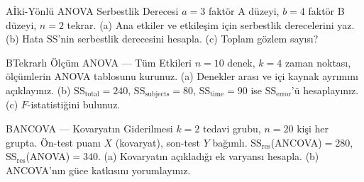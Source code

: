 \begin{alistirma}[Al.16.10]{A}{İki-Yönlü ANOVA Serbestlik Derecesi}
$a=3$ faktör A düzeyi, $b=4$ faktör B düzeyi, $n=2$ tekrar. (a) Ana etkiler ve etkileşim için serbestlik derecelerini yaz. (b) Hata SS'nin serbestlik derecesini hesapla. (c) Toplam gözlem sayısı?
\end{alistirma}

\begin{alistirma}[Al.16.11]{B}{Tekrarlı Ölçüm ANOVA --- Tüm Etkileri}
$n=10$ denek, $k=4$ zaman noktası, ölçümlerin ANOVA tablosunu kurunuz. (a) Denekler arası ve içi kaynak ayrımını açıklayınız. (b) $\mathrm{SS}_\mathrm{total}=240$, $\mathrm{SS}_\mathrm{subjects}=80$, $\mathrm{SS}_\mathrm{time}=90$ ise $\mathrm{SS}_\mathrm{error}$'ü hesaplayınız. (c) $F$-istatistiğini bulunuz.
\end{alistirma}

\begin{alistirma}[Al.16.12]{B}{ANCOVA --- Kovaryatın Giderilmesi}
$k=2$ tedavi grubu, $n=20$ kişi her grupta. Ön-test puanı $X$ (kovaryat), son-test $Y$ bağımlı. $\mathrm{SS}_\mathrm{res}$(ANCOVA)$=280$, $\mathrm{SS}_\mathrm{res}$(ANOVA)$=340$. (a) Kovaryatın açıkladığı ek varyansı hesapla. (b) ANCOVA'nın güce katkısını yorumlayınız.
\end{alistirma}
